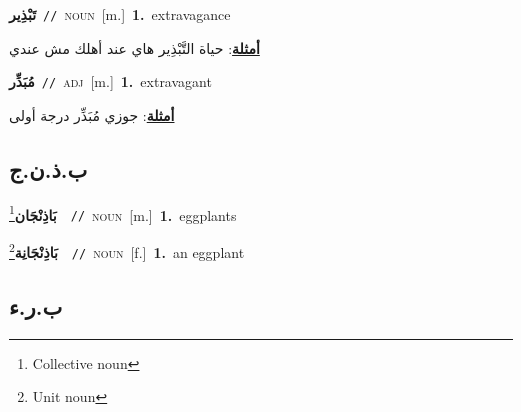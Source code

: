 \documentclass[10pt,a4paper,twoside]{article} %
\begin{document}
\begin{multicols}{2}
{\setlength\topsep{0pt}\textbf{\foreignlanguage{arabic}{تَبْذِير}}\ {\color{gray}\texttt{//}\color{black}}\ \textsc{noun}\ [m.]\ \textbf{1.}~extravagance\  \begin{flushright}\color{gray}\foreignlanguage{arabic}{\textbf{\underline{\foreignlanguage{arabic}{أمثلة}}}: حياة التَّبْذِير هاي عند أهلك مش عندي}\end{flushright}\color{black}} \vspace{2mm}

{\setlength\topsep{0pt}\textbf{\foreignlanguage{arabic}{مُبَذِّر}}\ {\color{gray}\texttt{//}\color{black}}\ \textsc{adj}\ [m.]\ \textbf{1.}~extravagant\  \begin{flushright}\color{gray}\foreignlanguage{arabic}{\textbf{\underline{\foreignlanguage{arabic}{أمثلة}}}: جوزي مُبَذِّر درجة أولى}\end{flushright}\color{black}} \vspace{2mm}

\vspace{-3mm}
\subsection*{\color{blue}\foreignlanguage{arabic}{ب.ذ.ن.ج}\color{blue}{ (ntws)}} 

{\setlength\topsep{0pt}\textbf{\foreignlanguage{arabic}{بَاذِنْجَان}}\footnote{Collective noun}\ \ {\color{gray}\texttt{//}\color{black}}\ \textsc{noun}\ [m.]\ \textbf{1.}~eggplants\ } \vspace{2mm}

{\setlength\topsep{0pt}\textbf{\foreignlanguage{arabic}{بَاذِنْجَانِة}}\footnote{Unit noun}\ \ {\color{gray}\texttt{//}\color{black}}\ \textsc{noun}\ [f.]\ \textbf{1.}~an eggplant\ } \vspace{2mm}

\vspace{-3mm}
\subsection*{\color{blue}\foreignlanguage{arabic}{ب.ر.ء}\color{blue}{}} 


\end{multicols}
\end{document}

